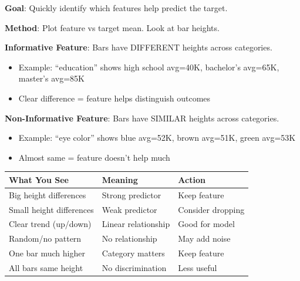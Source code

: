 \documentclass[11pt,a4paper]{article}
\begin{document}
\begin{definitionbox}

\textbf{Goal}: Quickly identify which features help predict the target.

\textbf{Method}: Plot feature vs target mean. Look at bar heights.

\textbf{Informative Feature}: Bars have DIFFERENT heights across categories.
\begin{itemize}[leftmargin=*,nosep]
\item Example: ``education'' shows high school avg=40K, bachelor's avg=65K, master's avg=85K
\item Clear difference = feature helps distinguish outcomes
\end{itemize}

\textbf{Non-Informative Feature}: Bars have SIMILAR heights across categories.
\begin{itemize}[leftmargin=*,nosep]
\item Example: ``eye color'' shows blue avg=52K, brown avg=51K, green avg=53K
\item Almost same = feature doesn't help much
\end{itemize}
\end{definitionbox}

\begin{examplebox}

\begin{tabular}{@{}l|l|l@{}}
\textbf{What You See} & \textbf{Meaning} & \textbf{Action} \\
\hline
Big height differences & Strong predictor & Keep feature \\
Small height differences & Weak predictor & Consider dropping \\
Clear trend (up/down) & Linear relationship & Good for model \\
Random/no pattern & No relationship & May add noise \\
One bar much higher & Category matters & Keep feature \\
All bars same height & No discrimination & Less useful \\
\end{tabular}
\end{examplebox}
\end{document}
